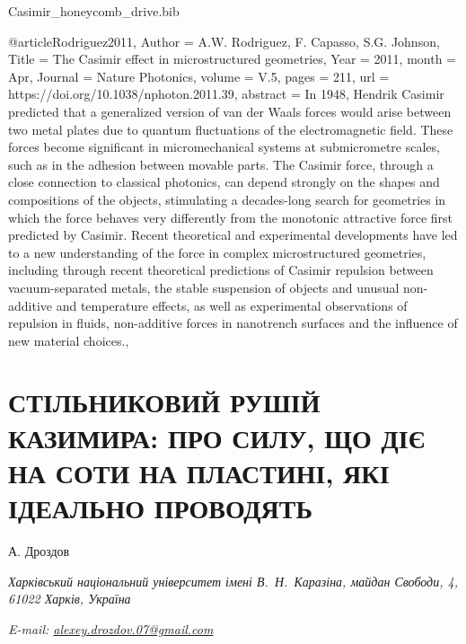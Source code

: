 \documentclass[twoside, 10pt, ptm]{article}
\makeatletter
\def\myfilename{Casimir_honeycomb_drive}
\def\mynameukr{А. Дроздов}
\def\mytitleukr{Стільниковий рушій Казимира: про силу, що діє на соти на пластині, які ідеально проводять}
\def\myemail{alexey.drozdov.07@gmail.com}
\def\myworkplaceukr{Харківський національний університет імені В.~Н.~Каразіна, майдан Свободи, 4, 61022 Харків, Україна}
\def\myorcidlink{0009-0004-1386-4534}
\newcommand{\MyTitleUkr}{\expandafter\MakeUppercase\expandafter{\mytitleukr}}
\makeatother
\begin{document}
\begin{multicols}{2}
\begin{filecontents}{\myfilename.bib}


@article{Rodriguez2011,
    Author = {A.W. Rodriguez, F. Capasso, S.G. Johnson},
    Title = {The Casimir effect in microstructured geometries},
    Year = {2011},
    month = {Apr},
    Journal = {Nature Photonics},
    volume = {V.5},
    pages = {211},
    url = {https://doi.org/10.1038/nphoton.2011.39},
    abstract = {In 1948, Hendrik Casimir predicted that a generalized version of van der Waals forces would arise between two metal plates due to quantum fluctuations of the electromagnetic field. These forces become significant in micromechanical systems at submicrometre scales, such as in the adhesion between movable parts. The Casimir force, through a close connection to classical photonics, can depend strongly on the shapes and compositions of the objects, stimulating a decades-long search for geometries in which the force behaves very differently from the monotonic attractive force first predicted by Casimir. Recent theoretical and experimental developments have led to a new understanding of the force in complex microstructured geometries, including through recent theoretical predictions of Casimir repulsion between vacuum-separated metals, the stable suspension of objects and unusual non-additive and temperature effects, as well as experimental observations of repulsion in fluids, non-additive forces in nanotrench surfaces and the influence of new material choices.},
}

\end{filecontents}




\end{multicols}

    
\pagebreak

\section*{\centering \uppercase{\MyTitleUkr}}

\centerline{\Large{\mynameukr \,\orcidlink{\myorcidlink} }}
\vspace{3mm}
\centerline{\textit{\myworkplaceukr}}
\centerline{\textit{E-mail: \href{mailto:\myemail}{\myemail}}}
\end{document}
